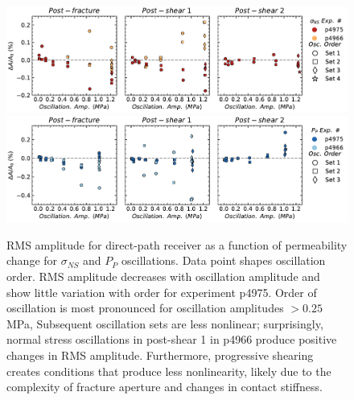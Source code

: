 \documentclass[letterpaper,10pt]{article}
\begin{document}
	\begin{figure}[ht]
		\centering
		\includegraphics[width=1\columnwidth]{delA_amp_NS}
		\includegraphics[width=1\columnwidth]{delA_amp_PP}
		\caption{RMS amplitude for direct-path receiver as a function of permeability change for $ \sigma_{NS} $ and $ P_P $ oscillations. Data point shapes oscillation order.  RMS amplitude decreases with oscillation amplitude and show little variation with order for experiment p4975. Order of oscillation is most pronounced for oscillation amplitudes $ > 0.25 $ MPa, Subsequent oscillation sets are less nonlinear; surprisingly, normal stress oscillations in post-shear 1 in p4966 produce positive changes in RMS amplitude. Furthermore, progressive shearing creates conditions that produce less nonlinearity, likely due to the complexity of fracture aperture and changes in contact stiffness. }
		\label{fig:delA_ns_amp}
	\end{figure}
	
	\clearpage
	
\end{document}
